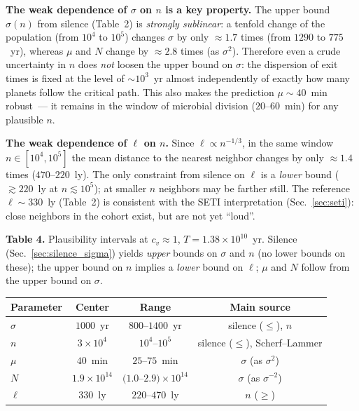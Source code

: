 \documentclass[11pt,a4paper]{article}
\begin{document}
\textbf{The weak dependence of $\sigma$ on $n$ is a key property.} The upper bound $\sigma(n)$ from silence (Table~2) is \emph{strongly sublinear}: a tenfold change of the population (from $10^4$ to $10^5$) changes $\sigma$ by only $\approx1.7$ times (from $1290$ to $775$~yr), whereas $\mu$ and $N$ change by $\approx2.8$ times (as $\sigma^2$). Therefore even a crude uncertainty in $n$ does \emph{not} loosen the upper bound on $\sigma$: the dispersion of exit times is fixed at the level of $\sim10^3$~yr almost independently of exactly how many planets follow the critical path. This also makes the prediction $\mu\sim40$~min robust~--- it remains in the window of microbial division ($20$--$60$~min) for any plausible $n$.

\textbf{The weak dependence of $\ell$ on $n$.} Since $\ell \propto n^{-1/3}$, in the same window $n\in[10^4,10^5]$ the mean distance to the nearest neighbor changes by only $\approx1.4$ times ($470$--$220$~ly). The only constraint from silence on $\ell$ is a \emph{lower} bound ($\gtrsim 220$~ly at $n \lesssim 10^5$); at smaller $n$ neighbors may be farther still. The reference $\ell \sim 330$~ly (Table~2) is consistent with the SETI interpretation (Sec.~\ref{sec:seti}): close neighbors in the cohort exist, but are not yet ``loud''.

\begin{center}
\textbf{Table 4.} Plausibility intervals at $c_v\approx1$, $T=1.38\times10^{10}$~yr. Silence (Sec.~\ref{sec:silence_sigma}) yields \emph{upper} bounds on $\sigma$ and $n$ (no lower bounds on these); the upper bound on $n$ implies a \emph{lower} bound on $\ell$; $\mu$ and $N$ follow from the upper bound on $\sigma$.

\medskip
\begin{tabular}{lccc}
\toprule
Parameter & Center & Range & Main source \\
\midrule
$\sigma$ & $1000$~yr & $800$--$1400$~yr & silence ($\le$), $n$ \\
$n$ & $3\times10^4$ & $10^4$--$10^5$ & silence ($\le$), Scherf--Lammer \\
$\mu$ & $40$~min & $25$--$75$~min & $\sigma$ (as $\sigma^2$) \\
$N$ & $1.9\times10^{14}$ & $(1.0$--$2.9)\times10^{14}$ & $\sigma$ (as $\sigma^{-2}$) \\
$\ell$ & $330$~ly & $220$--$470$~ly & $n$ ($\ge$) \\
\bottomrule
\end{tabular}
\end{center}
\end{document}
